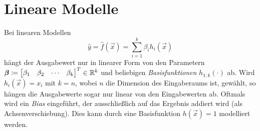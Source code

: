 	\section{Lineare Modelle}
		Bei linearen Modellen
		\begin{equation}
			\hat{y} = \hat{f}(\vec{x}) = \sum_{i = 1}^{k} \beta_i h_i(\vec{x})  \label{eq:linearRegr}
		\end{equation}
		hängt der Ausgabewert nur in linearer Form von den Parametern \( \bm{\beta} \coloneqq \begin{bmatrix} \beta_1 & \beta_2 & \cdots & \beta_k \end{bmatrix}^T \in \mathbb{R}^k \) und beliebigen \emph{Basisfunktionen} \( h_{1:k}(\cdot) \) ab. Wird \( h_i(\vec{x}) = x_i \) mit \( k = n \), wobei \(n\) die Dimension des Eingaberaums ist, gewählt, so hängen die Ausgabewerte sogar nur linear von den Eingabewerten ab. Oftmals wird ein \emph{Bias} eingeführt, der ausschließlich auf das Ergebnis addiert wird (als Achsenverschiebung). Dies kann \zB durch eine Basisfunktion \( h(\vec{x}) = 1 \) modelliert werden.

